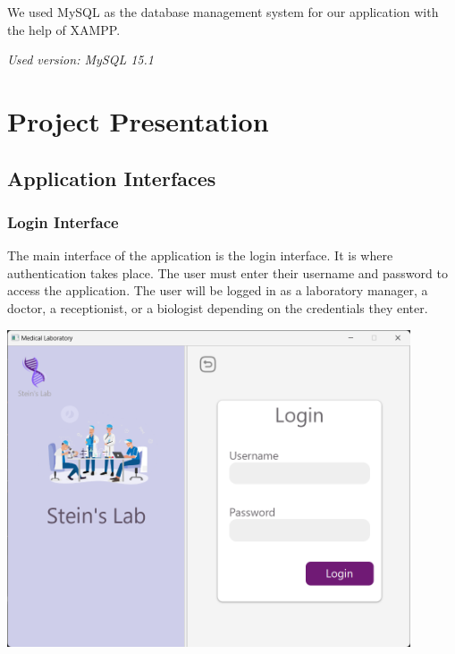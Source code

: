 \documentclass{article}
\begin{document}
We used MySQL as the database management system for our application with the help of XAMPP.

\textit{Used version: MySQL 15.1}
\newpage
\section[Project Presentation]{Project Presentation}
\subsection[Application Interfaces]{Application Interfaces}

\subsubsection*{Login Interface}
The main interface of the application is the login interface. It is where authentication takes place. The user must enter their username and password to access the application.
The user will be logged in as a laboratory manager, a doctor, a receptionist, or a biologist depending on the credentials they enter.
\begin{center}
    \includegraphics[width=451px]{media/interface/login.png}
\end{center}

\newpage
\end{document}
